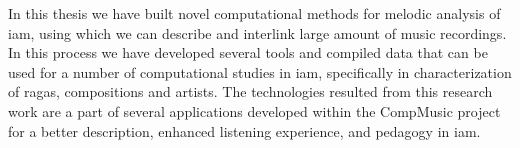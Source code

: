 In this thesis we have built novel computational methods for melodic analysis of \gls{iam}, using which we can describe and interlink large amount of music recordings. In this process we have developed several tools and compiled data that can be used for a number of computational studies in \gls{iam}, specifically in characterization of \glspl{raga}, compositions and artists. The technologies resulted from this research work are a part of several applications developed within the CompMusic project for a better description, enhanced listening experience, and pedagogy in \gls{iam}.


%
%
%
%
%
%
%
%
%


